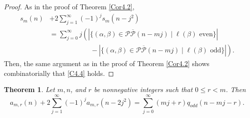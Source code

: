 \documentclass{amsart}
\newtheorem{theorem}{Theorem}[section]
\theoremstyle{definition}
\begin{document}
\begin{proof}As in the proof of Theorem \ref{Cor4.2}, \begin{align*}s_{m}(n)&+2\sum_{j=1}^\infty (-1)^j s_{m}(n-j^2)\\ & =\sum_{j=0}^\infty j\left(|\{(\alpha, \beta)\in  \mathcal P \overline{\mathcal P}(n-mj) \mid \ell(\beta) \text{ even}\}|\right.\\  &\qquad \qquad\qquad-\left. |\{(\alpha, \beta)\in  \mathcal P \overline{\mathcal P}(n-mj) \mid \ell(\beta) \text{ odd}\}|\right).\end{align*} Then, the same argument  as in the proof of Theorem \ref{Cor4.2} shows combinatorially that \eqref{C4.4} holds.   
\end{proof}


\begin{theorem}{\cite[Corollary 4.6]{M23}} \label{Cor4.6} Let $m,n$, and $r$ be nonnegative integers such that $0\leq r<m$. Then \begin{equation} \label{C4.6} a_{m,r}(n)+2\sum_{j=1}^\infty (-1)^j a_{m,r}(n-2j^2)= \sum_{j=0}^\infty (mj+r)q_{odd}(n-mj-r).\end{equation}\end{theorem}
\end{document}
